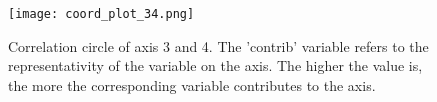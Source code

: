 \begin{figure} [!htbp]
	\begin{center}
		\texttt{[image: coord\_plot\_34.png]}
	\end{center}
	\caption[FAMD's correlation circle for third and fourth axis]{Correlation circle of axis 3 and 4. The 'contrib' variable refers to the representativity of the variable on the axis. The higher the value is, the more the corresponding variable contributes to the axis.}
	\label{fig:corr_circ_34}
\end{figure}

